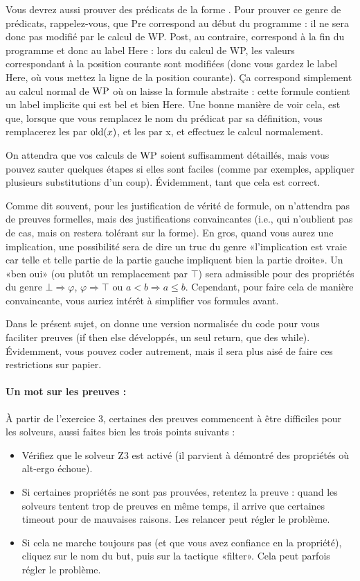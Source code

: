 \documentclass[11pt,answers]{exam}
\begin{document}
Vous devrez aussi prouver des prédicats de la forme .
Pour prouver ce genre de prédicats, rappelez-vous, que Pre correspond au début du programme : il ne sera donc pas modifié par le calcul de WP. Post, au contraire, correspond à la fin du programme et donc au label Here : lors du calcul de WP, les valeurs correspondant à la position courante sont modifiées (donc vous gardez le label Here, où vous mettez la ligne de la position courante). Ça correspond simplement au calcul normal de $\mathrm{WP}$ où on laisse la formule abstraite : cette formule contient un label implicite qui est bel et bien Here.
Une bonne manière de voir cela, est que, lorsque que vous remplacez le nom du prédicat par sa définition, vous remplacerez les  par $\mathrm{old}(x)$, et les  par x, et effectuez le calcul normalement.

On attendra que vos calculs de $\mathrm{WP}$ soient suffisamment détaillés, mais vous pouvez sauter quelques étapes si elles sont faciles (comme par exemples, appliquer plusieurs substitutions d’un coup). Évidemment, tant que cela est correct.

Comme dit souvent, pour les justification de vérité de formule, on n’attendra pas de preuves formelles, mais des justifications convaincantes (i.e., qui n’oublient pas de cas, mais on restera tolérant sur la forme).
En gros, quand vous aurez une implication, une possibilité sera de dire un truc du genre «l’implication est vraie car telle et telle partie de la partie gauche impliquent bien la partie droite».
Un «ben oui» (ou plutôt un remplacement par $\top$) sera admissible pour des propriétés du genre $\bot \Rightarrow \varphi$, $\varphi \Rightarrow \top$ ou $a < b \Rightarrow a \leq b$.
Cependant, pour faire cela de manière convaincante, vous auriez intérêt à simplifier vos formules avant.

Dans le présent sujet, on donne une version normalisée du code pour vous faciliter
preuves (if then else développés, un seul return, que des while). Évidemment, vous pouvez
coder autrement, mais il sera plus aisé de faire ces restrictions sur papier.

\paragraph{Un mot sur les preuves :}

À partir de l’exercice 3, certaines des preuves commencent à être difficiles pour les solveurs, aussi faites bien les trois points suivants :
\begin{itemize}
    \item Vérifiez que le solveur Z3 est activé (il parvient à démontré des propriétés où alt-ergo échoue).
    \item Si certaines propriétés ne sont pas prouvées, retentez la preuve : quand les solveurs tentent trop de preuves en même temps, il arrive que certaines timeout pour de mauvaises raisons. Les relancer peut régler le problème.
    \item Si cela ne marche toujours pas (et que vous avez confiance en la propriété), cliquez sur le nom du but, puis sur la tactique «filter». Cela peut parfois régler le problème.
\end{itemize}
\end{document}
